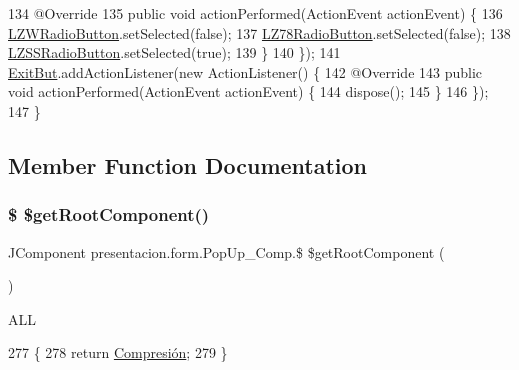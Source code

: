\begin{DoxyCode}
134             @Override
135             \textcolor{keyword}{public} \textcolor{keywordtype}{void} actionPerformed(ActionEvent actionEvent) \{
136                 \hyperlink{classpresentacion_1_1form_1_1PopUp__Comp_a810fe251f9c88e3b83ce466feafafe2e}{LZWRadioButton}.setSelected(\textcolor{keyword}{false});
137                 \hyperlink{classpresentacion_1_1form_1_1PopUp__Comp_ac750ecbde516e2fee470693124d2ff63}{LZ78RadioButton}.setSelected(\textcolor{keyword}{false});
138                 \hyperlink{classpresentacion_1_1form_1_1PopUp__Comp_ad18c1029f04cc43d033183dca943977c}{LZSSRadioButton}.setSelected(\textcolor{keyword}{true});
139             \}
140         \});
141         \hyperlink{classpresentacion_1_1form_1_1PopUp__Comp_aad0de868daa06f82567784941064f12d}{ExitBut}.addActionListener(\textcolor{keyword}{new} ActionListener() \{
142             @Override
143             \textcolor{keyword}{public} \textcolor{keywordtype}{void} actionPerformed(ActionEvent actionEvent) \{
144                 dispose();
145             \}
146         \});
147     \}
\end{DoxyCode}


\subsection{Member Function Documentation}
\mbox{\label{classpresentacion_1_1form_1_1PopUp__Comp_a8f22f1163ae09f7b29cf322670530af9}} 
\subsubsection{\texorpdfstring{\$ \$get\+Root\+Component()}{$ $getRootComponent()}}
{\footnotesize\ttfamily J\+Component presentacion.\+form.\+Pop\+Up\+\_\+\+Comp.\$ \$get\+Root\+Component (\begin{DoxyParamCaption}{ }\end{DoxyParamCaption})\hspace{0.3cm}{\ttfamily [inline]}}

A\+LL 
\begin{DoxyCode}
277                                                \{
278         \textcolor{keywordflow}{return} \hyperlink{classpresentacion_1_1form_1_1PopUp__Comp_a5769b499f21466bae765c41428512966}{Compresión};
279     \}
\end{DoxyCode}
\mbox{\label{classpresentacion_1_1form_1_1PopUp__Comp_a6742ee8edc772104c5d78f3eb5888b49}} 
